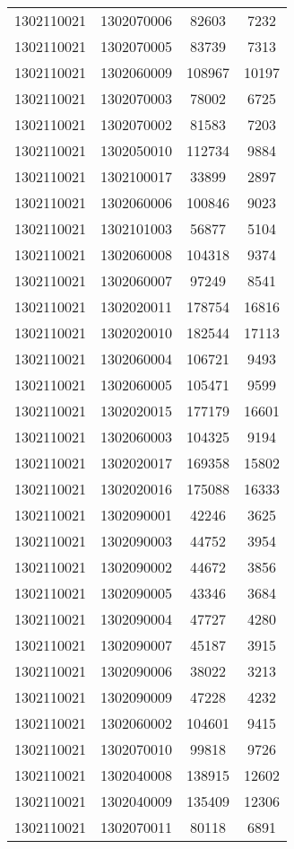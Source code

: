 \begin{longtable}[h]{llcc}
		1302110021 & 1302070006 & 82603 & 7232\\
		1302110021 & 1302070005 & 83739 & 7313\\
		1302110021 & 1302060009 & 108967 & 10197\\
		1302110021 & 1302070003 & 78002 & 6725\\
		1302110021 & 1302070002 & 81583 & 7203\\
		1302110021 & 1302050010 & 112734 & 9884\\
		1302110021 & 1302100017 & 33899 & 2897\\
		1302110021 & 1302060006 & 100846 & 9023\\
		1302110021 & 1302101003 & 56877 & 5104\\
		1302110021 & 1302060008 & 104318 & 9374\\
		1302110021 & 1302060007 & 97249 & 8541\\
		1302110021 & 1302020011 & 178754 & 16816\\
		1302110021 & 1302020010 & 182544 & 17113\\
		1302110021 & 1302060004 & 106721 & 9493\\
		1302110021 & 1302060005 & 105471 & 9599\\
		1302110021 & 1302020015 & 177179 & 16601\\
		1302110021 & 1302060003 & 104325 & 9194\\
		1302110021 & 1302020017 & 169358 & 15802\\
		1302110021 & 1302020016 & 175088 & 16333\\
		1302110021 & 1302090001 & 42246 & 3625\\
		1302110021 & 1302090003 & 44752 & 3954\\
		1302110021 & 1302090002 & 44672 & 3856\\
		1302110021 & 1302090005 & 43346 & 3684\\
		1302110021 & 1302090004 & 47727 & 4280\\
		1302110021 & 1302090007 & 45187 & 3915\\
		1302110021 & 1302090006 & 38022 & 3213\\
		1302110021 & 1302090009 & 47228 & 4232\\
		1302110021 & 1302060002 & 104601 & 9415\\
		1302110021 & 1302070010 & 99818 & 9726\\
		1302110021 & 1302040008 & 138915 & 12602\\
		1302110021 & 1302040009 & 135409 & 12306\\
		1302110021 & 1302070011 & 80118 & 6891\\

\end{longtable}
